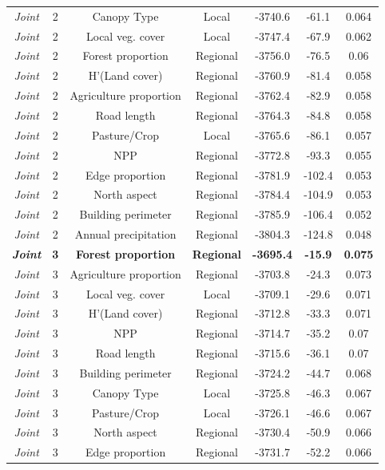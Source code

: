 \documentclass[preprint,final,times,12pt,3p]{elsarticle}
\begin{document}
\begin{longtable}{ c c c c c c c}
	\emph{Joint} & 2 & Canopy Type & Local & -3740.6 & -61.1 & 0.064 \\
	\emph{Joint} & 2 & Local veg. cover & Local & -3747.4 & -67.9 & 0.062 \\
	\emph{Joint} & 2 & Forest proportion & Regional & -3756.0 & -76.5 & 0.06 \\
	\emph{Joint} & 2 & H'(Land cover) & Regional & -3760.9 & -81.4 & 0.058 \\
	\emph{Joint} & 2 & Agriculture proportion & Regional & -3762.4 & -82.9 & 0.058 \\
	\emph{Joint} & 2 & Road length & Regional & -3764.3 & -84.8 & 0.058 \\
	\emph{Joint} & 2 & Pasture/Crop & Local & -3765.6 & -86.1 & 0.057 \\
	\emph{Joint} & 2 & NPP & Regional & -3772.8 & -93.3 & 0.055 \\
	\emph{Joint} & 2 & Edge proportion & Regional & -3781.9 & -102.4 & 0.053 \\
	\emph{Joint} & 2 & North aspect & Regional & -3784.4 & -104.9 & 0.053 \\
	\emph{Joint} & 2 & Building perimeter & Regional & -3785.9 & -106.4 & 0.052 \\
	\emph{Joint} & 2 & Annual precipitation & Regional & -3804.3 & -124.8 & 0.048 \\
	\textbf{\emph{Joint}} & \textbf{3} & \textbf{Forest proportion} & \textbf{Regional} & \textbf{-3695.4} & \textbf{-15.9} & \textbf{0.075} \\
	\emph{Joint} & 3 & Agriculture proportion & Regional & -3703.8 & -24.3 & 0.073 \\
	\emph{Joint} & 3 & Local veg. cover & Local & -3709.1 & -29.6 & 0.071 \\
	\emph{Joint} & 3 & H'(Land cover) & Regional & -3712.8 & -33.3 & 0.071 \\
	\emph{Joint} & 3 & NPP & Regional & -3714.7 & -35.2 & 0.07 \\
	\emph{Joint} & 3 & Road length & Regional & -3715.6 & -36.1 & 0.07 \\
	\emph{Joint} & 3 & Building perimeter & Regional & -3724.2 & -44.7 & 0.068 \\
	\emph{Joint} & 3 & Canopy Type & Local & -3725.8 & -46.3 & 0.067 \\
	\emph{Joint} & 3 & Pasture/Crop & Local & -3726.1 & -46.6 & 0.067 \\
	\emph{Joint} & 3 & North aspect & Regional & -3730.4 & -50.9 & 0.066 \\
	\emph{Joint} & 3 & Edge proportion & Regional & -3731.7 & -52.2 & 0.066 \\

\end{longtable}
\end{document}
